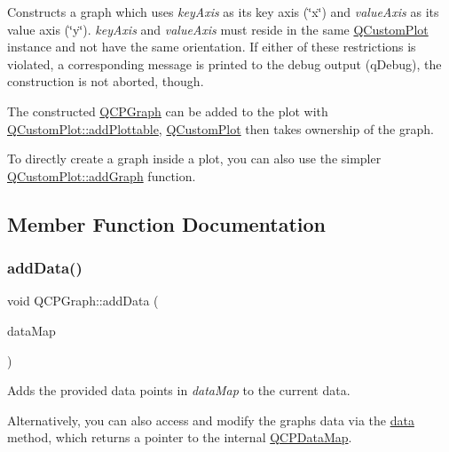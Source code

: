 Constructs a graph which uses {\itshape key\+Axis} as its key axis (\char`\"{}x\char`\"{}) and {\itshape value\+Axis} as its value axis (\char`\"{}y\char`\"{}). {\itshape key\+Axis} and {\itshape value\+Axis} must reside in the same \hyperlink{class_q_custom_plot}{Q\+Custom\+Plot} instance and not have the same orientation. If either of these restrictions is violated, a corresponding message is printed to the debug output (q\+Debug), the construction is not aborted, though.

The constructed \hyperlink{class_q_c_p_graph}{Q\+C\+P\+Graph} can be added to the plot with \hyperlink{class_q_custom_plot_ab7ad9174f701f9c6f64e378df77927a6}{Q\+Custom\+Plot\+::add\+Plottable}, \hyperlink{class_q_custom_plot}{Q\+Custom\+Plot} then takes ownership of the graph.

To directly create a graph inside a plot, you can also use the simpler \hyperlink{class_q_custom_plot_a6fb2873d35a8a8089842d81a70a54167}{Q\+Custom\+Plot\+::add\+Graph} function. 

\subsection{Member Function Documentation}
\hypertarget{class_q_c_p_graph_aa5c6181d84db72ce4dbe9dc15a34ef4f}{}\label{class_q_c_p_graph_aa5c6181d84db72ce4dbe9dc15a34ef4f} 
\subsubsection{\texorpdfstring{add\+Data()}{addData()}\hspace{0.1cm}{\footnotesize\ttfamily [1/4]}}
{\footnotesize\ttfamily void Q\+C\+P\+Graph\+::add\+Data (\begin{DoxyParamCaption}\item[{const \hyperlink{qcustomplot_8h_a84a9c4a4c2216ccfdcb5f3067cda76e3}{Q\+C\+P\+Data\+Map} \&}]{data\+Map }\end{DoxyParamCaption})}

Adds the provided data points in {\itshape data\+Map} to the current data.

Alternatively, you can also access and modify the graph\textquotesingle{}s data via the \hyperlink{class_q_c_p_graph_acde1c0d1f6a817930489548396e6b3e6}{data} method, which returns a pointer to the internal \hyperlink{qcustomplot_8h_a84a9c4a4c2216ccfdcb5f3067cda76e3}{Q\+C\+P\+Data\+Map}.

